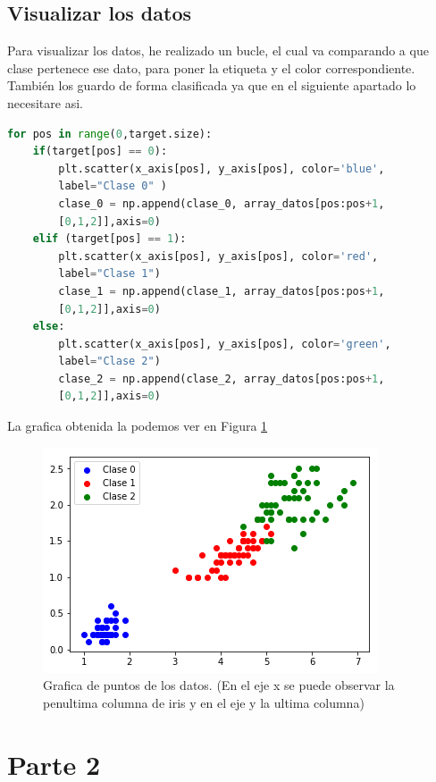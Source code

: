 \documentclass[12pt,a4paper]{article}
\begin{document}
\subsection{Visualizar los datos}
Para visualizar los datos, he realizado un bucle, el cual va comparando a que clase pertenece ese dato, para poner la etiqueta y el color correspondiente. También los guardo de forma clasificada ya que en el siguiente apartado lo necesitare asi. 
\begin{lstlisting}[language=Python]
for pos in range(0,target.size):
    if(target[pos] == 0):
        plt.scatter(x_axis[pos], y_axis[pos], color='blue', 
        label="Clase 0" )
        clase_0 = np.append(clase_0, array_datos[pos:pos+1,
        [0,1,2]],axis=0)
    elif (target[pos] == 1):
        plt.scatter(x_axis[pos], y_axis[pos], color='red', 
        label="Clase 1")
        clase_1 = np.append(clase_1, array_datos[pos:pos+1,
        [0,1,2]],axis=0)
    else:
        plt.scatter(x_axis[pos], y_axis[pos], color='green', 
        label="Clase 2")
        clase_2 = np.append(clase_2, array_datos[pos:pos+1,
        [0,1,2]],axis=0)\end{lstlisting}
La grafica obtenida la podemos ver en Figura \ref{figura1}
\begin{figure}[H]  %
\centering
\includegraphics{images/graficaPuntos.png}  %
\caption{Grafica de puntos de los datos. (En el eje x se puede observar la penultima columna de iris y en el eje y la ultima columna)}
\label{figura1}
 
\end{figure}
\section{Parte 2}
\end{document}

